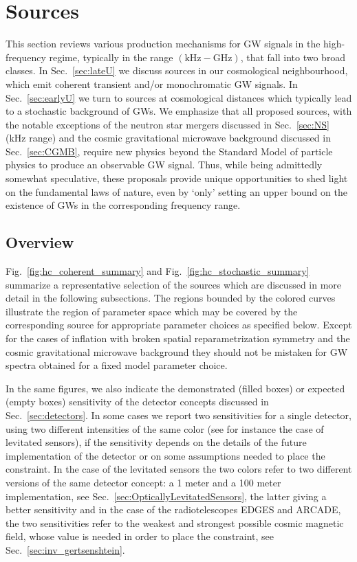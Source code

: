 \documentclass[11pt,a4paper]{article}
\begin{document}
%
\section{Sources}
\label{sec:th}
This section reviews various production mechanisms for GW signals in the high-frequency regime, typically in the range $(\text{kHz} - \text{GHz})$, that fall into two broad classes. In Sec.~\ref{sec:lateU} we discuss sources in our cosmological neighbourhood, which emit coherent transient and/or monochromatic GW signals. In Sec.~\ref{sec:earlyU} we turn to sources at cosmological distances which typically lead to a stochastic background of GWs. We emphasize that all proposed sources, with the notable exceptions of the neutron star mergers discussed in Sec.~\ref{sec:NS} (kHz range) and the cosmic gravitational microwave background discussed in Sec.~\ref{sec:CGMB}, require new physics beyond the Standard Model of particle physics to produce an observable GW signal. Thus, while being admittedly somewhat speculative, these proposals provide unique opportunities to shed light on the fundamental laws of nature, even by `only' setting an upper bound on the existence of GWs in the corresponding frequency range.

\subsection{Overview}
\label{sec:Summary}

Fig.~\ref{fig:hc_coherent_summary} and Fig.~\ref{fig:hc_stochastic_summary} summarize a representative selection of the sources which are discussed in more detail in the following subsections. The regions bounded by the colored curves illustrate the region of parameter space which may be covered by the corresponding source for appropriate parameter choices as specified below. Except for the cases of inflation with broken spatial reparametrization symmetry and the cosmic gravitational microwave background they should not be mistaken for GW spectra obtained for a fixed model parameter choice. 

In the same figures, we also indicate the demonstrated (filled boxes) or expected (empty boxes) sensitivity of the detector concepts discussed in Sec.~\ref{sec:detectors}.
In some cases we report two sensitivities for a single detector, using two different intensities of the same color (see for instance the case of levitated sensors), if the sensitivity depends on the details of the future implementation of the detector or on some assumptions needed to place the constraint. In  the case of the levitated sensors the two colors refer to two different versions of the same detector concept: a 1 meter and a 100 meter implementation, see Sec.~\ref{sec:OpticallyLevitatedSensors}, the latter giving a better sensitivity and in the case of the radiotelescopes EDGES and ARCADE, the two sensitivities refer to the weakest and strongest possible cosmic magnetic field, whose value is needed in order to place the constraint, see Sec.~\ref{sec:inv_gertsenshtein}.
\end{document}
